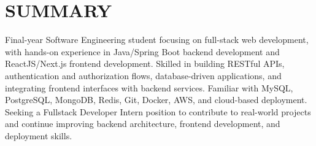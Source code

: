 \section{SUMMARY}
\small
\noindent Final-year Software Engineering student focusing on full-stack web development, with hands-on experience in Java/Spring Boot backend development and ReactJS/Next.js frontend development. Skilled in building RESTful APIs, authentication and authorization flows, database-driven applications, and integrating frontend interfaces with backend services. Familiar with MySQL, PostgreSQL, MongoDB, Redis, Git, Docker, AWS, and cloud-based deployment. Seeking a Fullstack Developer Intern position to contribute to real-world projects and continue improving backend architecture, frontend development, and deployment skills.

\normalsize
